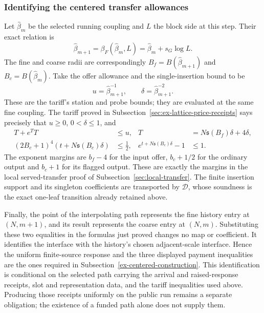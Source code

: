 \subsubsection{Identifying the centered transfer allowances}
Let $\widehat\beta_m$ be the selected running coupling and $L$ the
block side at this step. Their exact relation is
\[
 \widehat\beta_{m+1}
       =\beta_F(\widehat\beta_m,L)
       =\widehat\beta_m+s_G\log L.
\]
The fine and coarse radii are correspondingly
$B_f=B(\widehat\beta_{m+1})$ and $B_c=B(\widehat\beta_m)$.
Take the offer allowance and the single-insertion bound to be
\[
                   u=\widehat\beta_{m+1}^{-1},\qquad
                   \delta=\widehat\beta_{m+1}^{-2}.
\]
These are the tariff's station and probe bounds; they are evaluated
at the same fine coupling. The tariff proved in
Subsection~\ref{sec:ex-lattice-price-receipts} says precisely that
$u\ge0$, $0<\delta\le1$, and
\begin{align*}
 T+e^TT&\le u,&T&=N\mathfrak s(B_f)\delta+4\delta,\\
 (2B_c+1)^4(t+N\mathfrak s(B_c)\delta)&\le\tfrac12,&
 e^{t+N\mathfrak s(B_c)\delta}-1&\le1.
\end{align*}
The exponent margins are $b_f-4$ for the input offer, $b_c+1/2$ for
the ordinary output and $b_c+1$ for its flagged output. These are
exactly the margins in the local served-transfer proof of
Subsection~\ref{sec:local-transfer}. The finite insertion support and its singleton
coefficients are transported by $\mathcal D$, whose soundness is the
exact one-leaf transition already retained above.

Finally, the point of the interpolating path represents the fine history
entry at $(N,m+1)$, and its result represents the coarse entry at $(N,m)$.
Substituting these two equalities in the formulas just proved changes no
map or coefficient. It identifies the interface with the history's chosen
adjacent-scale interface. Hence the uniform finite-source response and the three displayed
payment inequalities are the ones required in
Subsection~\ref{ex-centered-construction}. This identification is conditional
on the selected path carrying the arrival and raised-response receipts,
slot and representation data, and the tariff inequalities used above.
Producing those receipts uniformly on the public run remains a separate
obligation; the existence of a funded path alone does not supply them.
